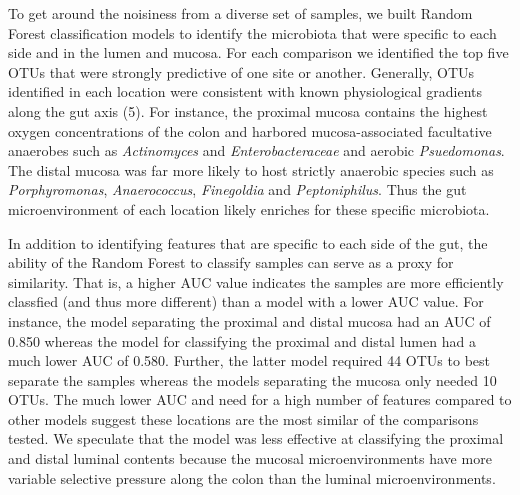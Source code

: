 \documentclass[12pt,]{article}
\begin{document}
To get around the noisiness from a diverse set of samples, we built
Random Forest classification models to identify the microbiota that were
specific to each side and in the lumen and mucosa. For each comparison
we identified the top five OTUs that were strongly predictive of one
site or another. Generally, OTUs identified in each location were
consistent with known physiological gradients along the gut axis (5).
For instance, the proximal mucosa contains the highest oxygen
concentrations of the colon and harbored mucosa-associated facultative
anaerobes such as \emph{Actinomyces} and \emph{Enterobacteraceae} and
aerobic \emph{Psuedomonas}. The distal mucosa was far more likely to
host strictly anaerobic species such as \emph{Porphyromonas},
\emph{Anaerococcus}, \emph{Finegoldia} and \emph{Peptoniphilus}. Thus
the gut microenvironment of each location likely enriches for these
specific microbiota.

In addition to identifying features that are specific to each side of
the gut, the ability of the Random Forest to classify samples can serve
as a proxy for similarity. That is, a higher AUC value indicates the
samples are more efficiently classfied (and thus more different) than a
model with a lower AUC value. For instance, the model separating the
proximal and distal mucosa had an AUC of 0.850 whereas the model for
classifying the proximal and distal lumen had a much lower AUC of 0.580.
Further, the latter model required 44 OTUs to best separate the samples
whereas the models separating the mucosa only needed 10 OTUs. The much
lower AUC and need for a high number of features compared to other
models suggest these locations are the most similar of the comparisons
tested. We speculate that the model was less effective at classifying
the proximal and distal luminal contents because the mucosal
microenvironments have more variable selective pressure along the colon
than the luminal microenvironments.
\end{document}
